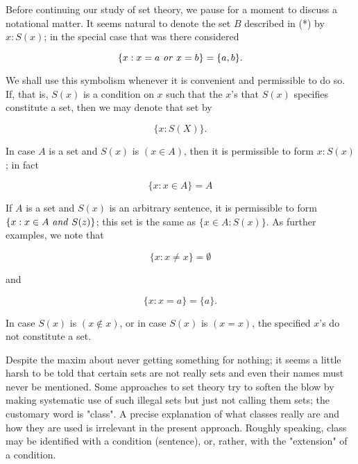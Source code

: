 Before continuing our study of set theory, we pause for a moment to discuss a notational matter. It seems natural to denote the set $B$ described in (*) by ${x: S(x)}$; in the special case that was there considered

\begin{equation*}
\{ x : x = a \text{ \textit{or} } x = b \} = \{ a,b \}.
\end{equation*}

We shall use this symbolism whenever it is convenient and permissible to do so. If, that is, $S(x)$ is a condition on $x$ such that the $x$'s that $S(x)$ specifies constitute a set, then we may denote that set by 

\begin{equation*}
\{ x : S(X) \}.
\end{equation*}

In case $A$ is a set and $S(x)$ is $(x \in A)$, then it is permissible to form ${x: S(x)}$; in fact 

\begin{equation*}
\{ x : x \in A \} = A
\end{equation*}

If $A$ is a set and $S(x)$ is an arbitrary sentence, it is permissible to form $ \{ x : x \in A \text{ \textit{and} } S(z) \}$; this set is the same as $\{x \in A: S(x) \}$. As further examples, we note that 

\begin{equation*}
\{ x : x \neq x \} = \emptyset
\end{equation*}

and

\begin{equation*}
\{ x : x = a \} = \{ a \}.
\end{equation*}

In case $S(x)$ is $(x \notin x)$, or in case $S(x)$ is $(x = x)$, the specified $x$'s do not constitute a set. 

Despite the maxim about never getting something for nothing; it seems a little harsh to be told that certain sets are not really sets and even their names must never be mentioned. Some approaches to set theory try to soften the blow by making systematic use of such illegal sets but just not calling them sets; the customary word is "class". A precise explanation of what classes really are and how they are used is irrelevant in the present approach. Roughly speaking, class may be identified with a condition (sentence), or, rather, with the "extension" of a condition.